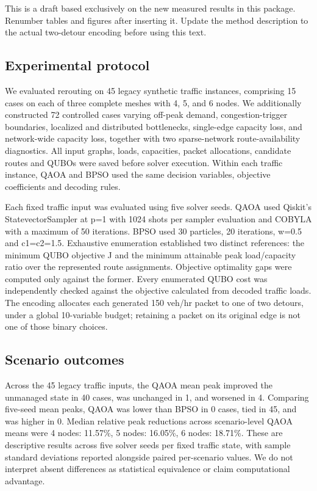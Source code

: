 
This is a draft based exclusively on the new measured results in this package. Renumber tables and figures after inserting it. Update the method description to the actual two-detour encoding before using this text.

\subsection{Experimental protocol}

We evaluated rerouting on 45 legacy synthetic traffic instances, comprising 15 cases on each of three complete meshes with 4, 5, and 6 nodes. We additionally constructed 72 controlled cases varying off-peak demand, congestion-trigger boundaries, localized and distributed bottlenecks, single-edge capacity loss, and network-wide capacity loss, together with two sparse-network route-availability diagnostics. All input graphs, loads, capacities, packet allocations, candidate routes and QUBOs were saved before solver execution. Within each traffic instance, QAOA and BPSO used the same decision variables, objective coefficients and decoding rules.

Each fixed traffic input was evaluated using five solver seeds. QAOA used Qiskit's StatevectorSampler at p=1 with 1024 shots per sampler evaluation and COBYLA with a maximum of 50 iterations. BPSO used 30 particles, 20 iterations, w=0.5 and c1=c2=1.5. Exhaustive enumeration established two distinct references: the minimum QUBO objective J and the minimum attainable peak load/capacity ratio over the represented route assignments. Objective optimality gaps were computed only against the former. Every enumerated QUBO cost was independently checked against the objective calculated from decoded traffic loads. The encoding allocates each generated 150 veh/hr packet to one of two detours, under a global 10-variable budget; retaining a packet on its original edge is not one of those binary choices.

\subsection{Scenario outcomes}

Across the 45 legacy traffic inputs, the QAOA mean peak improved the unmanaged state in 40 cases, was unchanged in 1, and worsened in 4. Comparing five-seed mean peaks, QAOA was lower than BPSO in 0 cases, tied in 45, and was higher in 0. Median relative peak reductions across scenario-level QAOA means were 4 nodes: 11.57\%, 5 nodes: 16.05\%, 6 nodes: 18.71\%. These are descriptive results across five solver seeds per fixed traffic state, with sample standard deviations reported alongside paired per-scenario values. We do not interpret absent differences as statistical equivalence or claim computational advantage.

